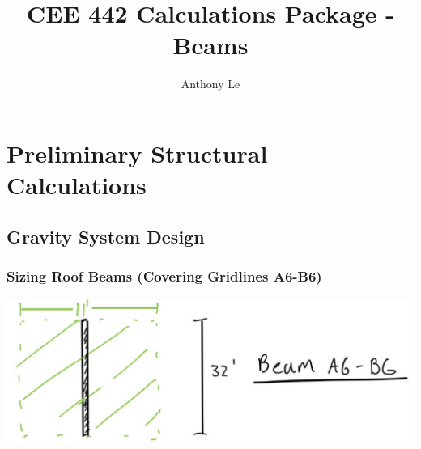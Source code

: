 \documentclass{report} %
\title{CEE 442 Calculations Package - Beams}
\author{Anthony Le}
\begin{document}
\pagestyle{fancy}
\fancyhead{}



\section*{Preliminary Structural Calculations}
\subsection*{Gravity System Design}
\subsubsection*{Sizing Roof Beams (Covering Gridlines A6-B6)}

\begin{center}
    \includegraphics[scale=0.25]{RoofBeams_A6_B6}
\end{center}
\end{document}
